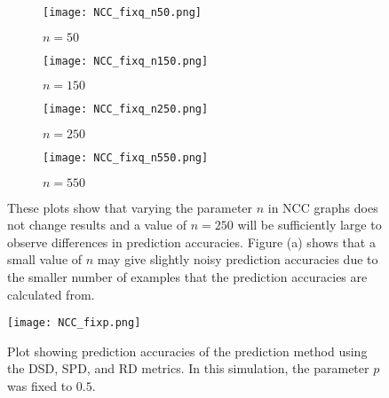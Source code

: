 \begin{figure}[H]
\begin{subfigure}[h]{0.5\linewidth}
\texttt{[image: NCC\_fixq\_n50.png]}
\caption{$n = 50$}
\end{subfigure}
\hfill
\begin{subfigure}[h]{0.5\linewidth}
\texttt{[image: NCC\_fixq\_n150.png]}
\caption{$n = 150$}
\end{subfigure}
\hfill
\begin{subfigure}[h]{0.5\linewidth}
\texttt{[image: NCC\_fixq\_n250.png]}
\caption{$n = 250$}
\end{subfigure}
\hfill
\begin{subfigure}[h]{0.5\linewidth}
\texttt{[image: NCC\_fixq\_n550.png]}
\caption{$n = 550$}
\end{subfigure}%
\caption{These plots show that varying the parameter $n$ in NCC graphs does not change results and a value of $n=250$ will be sufficiently large to observe differences in prediction accuracies. Figure (a) shows that a small value of $n$ may give slightly noisy prediction accuracies due to the smaller number of examples that the prediction accuracies are calculated from.}
\label{fig:NCC_n}
\end{figure}

\begin{figure}[H]
\centering
\texttt{[image: NCC\_fixp.png]}
\caption{Plot showing prediction accuracies of the prediction method using the DSD, SPD, and RD metrics. In this simulation, the parameter $p$ was fixed to $0.5$.}
\label{fig:NCC_fixp}
\end{figure}



